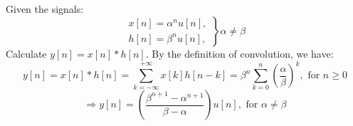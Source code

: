 \documentclass{article}
\begin{document}
\subsection{} Given the signals:
\begin{equation*}
\left. \begin{array}{l}
x[n] = {\alpha}^{n}u[n],  \\
h[n] = {\beta}^{n}u[n],
\end{array} \right\} \alpha \neq \beta
\end{equation*}
Calculate $y[n] = x[n]*h[n]$. By the definition of convolution, we have:
\begin{equation*}
y[n] = x[n]*h[n] = \sum_{k=-\infty}^{+\infty} x[k]h[n-k] = \beta^{n}\sum_{k=0}^{n} \left(\frac{\alpha}{\beta}\right)^{k},\textrm{ for }n \geq 0
\end{equation*}
\begin{equation*}
\Rightarrow y[n] = \left(\frac{\beta^{n+1}-\alpha^{n+1}}{\beta-\alpha}\right)u[n],\textrm{ for }\alpha \neq \beta
\end{equation*}
\setcounter{subsection}{27}
\end{document}
